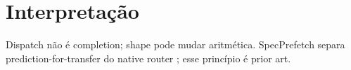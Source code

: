 \section{Interpretação}
Dispatch não é completion; shape pode mudar aritmética. SpecPrefetch separa prediction-for-transfer do native router \cite{kong2026specprefetch}; esse princípio é prior art.
